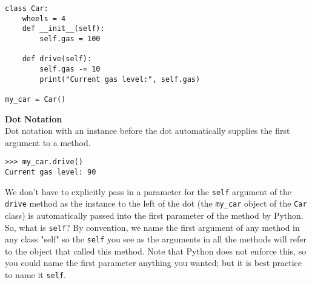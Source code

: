\begin{lstlisting}
class Car:
    wheels = 4
    def __init__(self):
        self.gas = 100

    def drive(self):
        self.gas -= 10
        print("Current gas level:", self.gas)

my_car = Car()
\end{lstlisting}

\textbf{Dot Notation} \\
Dot notation with an instance before the dot automatically supplies the first argument to a method.
\begin{lstlisting}
>>> my_car.drive()
Current gas level: 90
\end{lstlisting}
\hfill \break
We don’t have to explicitly pass in a parameter for the \lstinline{self} argument of the \lstinline{drive} method as the instance to the left of the dot (the \lstinline{my_car} object of the \lstinline{Car} class) is automatically passed into the first parameter of the method by Python. So, what is \lstinline{self}? By convention, we name the first argument of any method in any class "self" so the \lstinline{self} you see as the arguments in all the methods will refer to the object that called this method. Note that Python does not enforce this, so you could name the first parameter anything you wanted; but it is best practice to name it \lstinline{self}. \\\\

